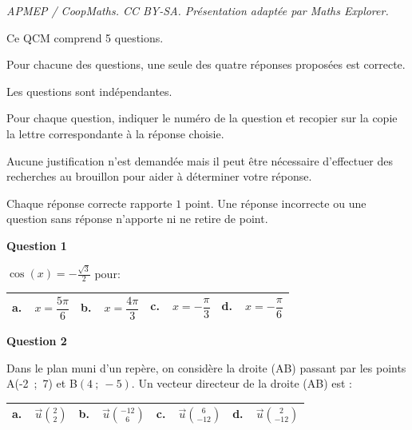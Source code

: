 \documentclass[10pt]{article}
\providecommand{\vect}[1]{\overrightarrow{#1}}
\begin{document}
\noindent\textit{APMEP / CoopMaths. CC BY-SA. Présentation adaptée par Maths Explorer.}\par\medskip
\medskip

Ce QCM comprend 5 questions.

Pour chacune des questions, une seule des quatre réponses proposées est correcte.

Les questions sont indépendantes.

Pour chaque question, indiquer le numéro de la question et recopier sur la copie la lettre correspondante à la réponse choisie.

Aucune justification n'est demandée mais il peut être nécessaire d'effectuer des recherches au brouillon pour aider à déterminer votre réponse.

Chaque réponse correcte rapporte $1$ point. Une réponse incorrecte ou une question sans réponse n'apporte ni ne retire de point.

\medskip

\textbf{Question 1}

\medskip

$\cos(x)  = - \frac{\sqrt{3}}{2}$ pour:

\begin{center}
\begin{tabularx}{\linewidth}{|*{4}{X|}}\hline
\textbf{a.~~}$x = \dfrac{5\pi}{6}$ &\textbf{b.~~}$x = \dfrac{4\pi}{3}$&\textbf{c.~~}$x = -\dfrac{\pi}{3}$&\textbf{d.~~}$x = - \dfrac{\pi}{6}$\rule[-3mm]{0mm}{9mm}\\ \hline
\end{tabularx}
\end{center}

\medskip

\textbf{Question 2}

\medskip

Dans le plan muni d'un repère, on considère la droite (AB) passant par les points
A(-2~;~7) et B$(4~;~-5)$. Un vecteur directeur de la droite (AB) est :

\begin{center}
\begin{tabularx}{\linewidth}{|*{4}{X|}}\hline
\textbf{a.~~}$\vect{u}\binom{2}{2}$ &\textbf{b.~~}$\vect{u}\binom{-12}{6}$&\textbf{c.~~}$\vect{u}\binom{6}{-12}$&\textbf{d.~~}$\vect{u}\binom{2}{-12}$\rule[-3mm]{0mm}{9mm}\\ \hline
\end{tabularx}
\end{center}

\medskip
\end{document}

